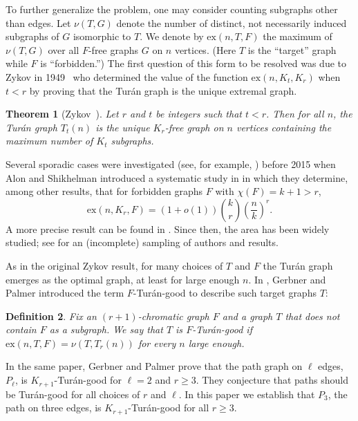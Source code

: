 \documentclass[12pt]{article}
\newtheorem{thm}{Theorem}[section]
\newtheorem{definition}[thm]{Definition}
\newcommand{\ext}{\text{ex}}
\begin{document}
To further generalize the problem, one may consider counting subgraphs other
than edges. Let $\nu(T,G)$ denote the number of distinct, not necessarily
induced subgraphs of $G$ isomorphic to $T$. We denote by $\ext(n,T,F)$ the
maximum of $\nu(T,G)$ over all $F$-free graphs $G$ on $n$ vertices. (Here $T$ is
the ``target'' graph while $F$ is ``forbidden.'') The first question of this
form to be resolved was due to Zykov in 1949~\cite{Zykov} who determined the
value of the function $\ext(n,K_t,K_r)$ when $t < r$ by proving that the
Tur\'{a}n graph is the unique extremal graph. 

\begin{thm}[Zykov~\cite{Zykov}]\label{thm_zykov_bound}
Let $r$ and $t$ be integers such that $t < r$. Then for all $n$, the Tur\'{a}n
graph $T_t(n)$ is the unique $K_r$-free graph on $n$ vertices containing the
maximum number of $K_t$ subgraphs. 
\end{thm}

Several sporadic cases were investigated (see, for example,
\cite{BollobasGyori, Gyori}) before 2015 when Alon and Shikhelman introduced a
systematic study in \cite{Alon} in which they determine, among other
results, that for forbidden graphs $F$ with $\chi(F) = k+1 > r$,
\[ \ext(n,K_r,F) = (1+o(1))\binom{k}{r}\left(\frac{n}{k}\right)^r. \]
A more precise result can be found in \cite{MaQiu}. Since then, the area has
been widely studied; see \cite{CutlerNirRadcliffe, GERBNER2019103001, HalfpapPalmer,
LohTaitTimmonsZhou, Luo} for an (incomplete) sampling of authors and results.

As in the original Zykov result, for many choices of $T$ and $F$ the Tur\'an graph
emerges as the optimal graph, at least for large enough $n$. In
\cite{GerbnerPalmer2020}, Gerbner and Palmer introduced the term
$F$-Tur\'an-good to describe such target graphs $T$:

\begin{definition}
Fix an $(r+1)$-chromatic graph $F$ and a graph $T$ that does not contain $F$ as a
subgraph. We say that $T$ is \emph{$F$-Tur\'an-good} if $\ext(n,T,F) =
\nu(T,T_r(n))$ for every $n$ large enough.
\end{definition}

In the same paper, Gerbner and Palmer prove that the path graph on $\ell$ edges,
$P_\ell$, is $K_{r+1}$-Tur\'an-good for $\ell = 2$ and $r \ge 3$. They
conjecture that paths should be Tur\'an-good for all choices of $r$ and $\ell$.
In this paper we establish that $P_3$, the path on three edges, is
$K_{r+1}$-Tur\'an-good for all $r \ge 3$.
\end{document}
